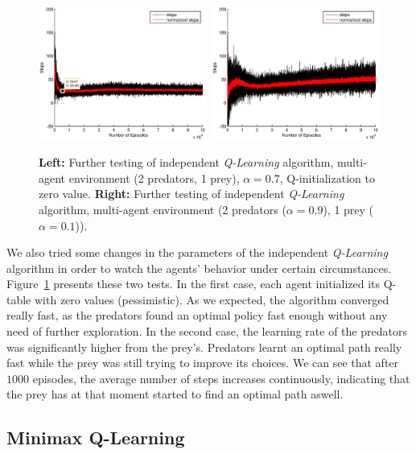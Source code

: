 \documentclass[a4paper,11pt]{article}
\begin{document}
\begin{figure}[ht!]
  \centering
    \includegraphics[width=0.49\textwidth]{figures/q2init.eps}\	
    \includegraphics[width=0.49\textwidth]{figures/q2learnfast.eps}
    \caption{\textbf{Left:} Further testing of independent \textit{Q-Learning} algorithm, multi-agent environment (2 predators, 1 prey), $\alpha = 0.7$, Q-initialization to zero value. \textbf{Right:} Further testing of independent \textit{Q-Learning} algorithm, multi-agent environment (2 predators ($\alpha = 0.9$), 1 prey ($\alpha = 0.1$)).}
    \label{qtest}
\end{figure}

We also tried some changes in the parameters of the independent \textit{Q-Learning} algorithm in order to watch the agents' behavior under certain circumstances. Figure~\ref{qtest} presents these two tests. In the first case, each agent initialized its Q-table with zero values (pessimistic). As we expected, the algorithm converged really fast,
 as the predators found an optimal policy fast enough without any need of further exploration. In the second case, the learning rate of the predators was significantly higher from the prey's. Predators learnt an optimal path really fast while the prey was still trying to improve its choices. We can see that after $1000$ episodes, the average number of steps increases continuously, indicating that the prey has at that moment started to find an optimal path aswell.


\subsection{Minimax Q-Learning}
\end{document}
